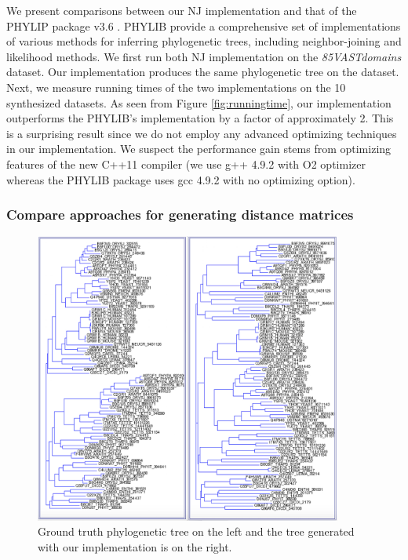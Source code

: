 \documentclass[11pt,letterpaper]{article}
\theoremstyle{definition}
\begin{document}
We present comparisons between our NJ implementation and that of the PHYLIP package v3.6 \cite{felsenstein2005phylip}. PHYLIB provide a comprehensive set of implementations of various methods for inferring phylogenetic trees, including neighbor-joining and likelihood methods. We first run both NJ implementation on the \textit{85VASTdomains} dataset. Our implementation produces the same phylogenetic tree on the dataset. Next, we measure running times of the two implementations on the 10 synthesized datasets. As seen from Figure \ref{fig:runningtime}, our implementation outperforms the PHYLIB's implementation by a factor of approximately 2. This is a surprising result since we do not employ any advanced optimizing techniques in our implementation. We suspect the performance gain stems from optimizing features of the new C++11 compiler (we use g++ 4.9.2 with O2 optimizer whereas the PHYLIB package uses gcc 4.9.2 with no optimizing option).  

\subsubsection{Compare approaches for generating distance matrices}

\begin{figure}[h!]
  \centering
  \includegraphics[width=0.9\textwidth]{gt-PMB.jpg}
  \caption{Ground truth phylogenetic tree on the left and the tree generated with our implementation is on the right.}
  \label{fig:gt-kimura}
\end{figure}
\end{document}
